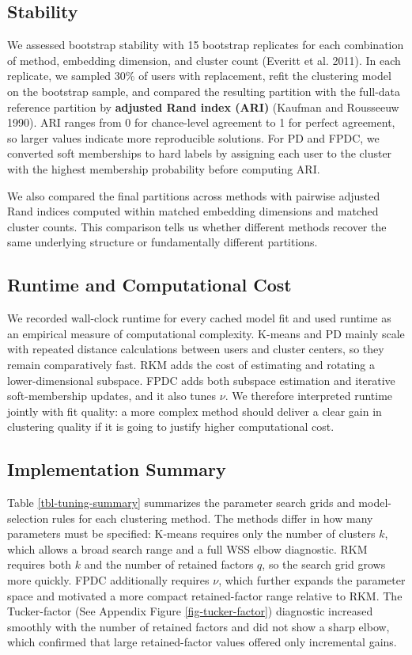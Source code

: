 \documentclass[
  11pt,
  letterpaper,
  DIV=11,
  numbers=noendperiod]{scrartcl}
\begin{document}
\subsection{Stability}\label{stability}

We assessed bootstrap stability with 15 bootstrap replicates for each
combination of method, embedding dimension, and cluster count (Everitt
et al. 2011). In each replicate, we sampled 30\% of users with
replacement, refit the clustering model on the bootstrap sample, and
compared the resulting partition with the full-data reference partition
by \textbf{adjusted Rand index (ARI)} (Kaufman and Rousseeuw 1990). ARI
ranges from 0 for chance-level agreement to 1 for perfect agreement, so
larger values indicate more reproducible solutions. For PD and FPDC, we
converted soft memberships to hard labels by assigning each user to the
cluster with the highest membership probability before computing ARI.

We also compared the final partitions across methods with pairwise
adjusted Rand indices computed within matched embedding dimensions and
matched cluster counts. This comparison tells us whether different
methods recover the same underlying structure or fundamentally different
partitions.

\subsection{Runtime and Computational
Cost}\label{runtime-and-computational-cost}

We recorded wall-clock runtime for every cached model fit and used
runtime as an empirical measure of computational complexity. K-means and
PD mainly scale with repeated distance calculations between users and
cluster centers, so they remain comparatively fast. RKM adds the cost of
estimating and rotating a lower-dimensional subspace. FPDC adds both
subspace estimation and iterative soft-membership updates, and it also
tunes \(\nu\). We therefore interpreted runtime jointly with fit
quality: a more complex method should deliver a clear gain in clustering
quality if it is going to justify higher computational cost.

\subsection{Implementation Summary}\label{implementation-summary}

Table \ref{tbl-tuning-summary} summarizes the parameter search grids and
model-selection rules for each clustering method. The methods differ in
how many parameters must be specified: K-means requires only the number
of clusters \(k\), which allows a broad search range and a full WSS
elbow diagnostic. RKM requires both \(k\) and the number of retained
factors \(q\), so the search grid grows more quickly. FPDC additionally
requires \(\nu\), which further expands the parameter space and
motivated a more compact retained-factor range relative to RKM. The
Tucker-factor (See Appendix Figure \ref{fig-tucker-factor}) diagnostic
increased smoothly with the number of retained factors and did not show
a sharp elbow, which confirmed that large retained-factor values offered
only incremental gains.
\end{document}
